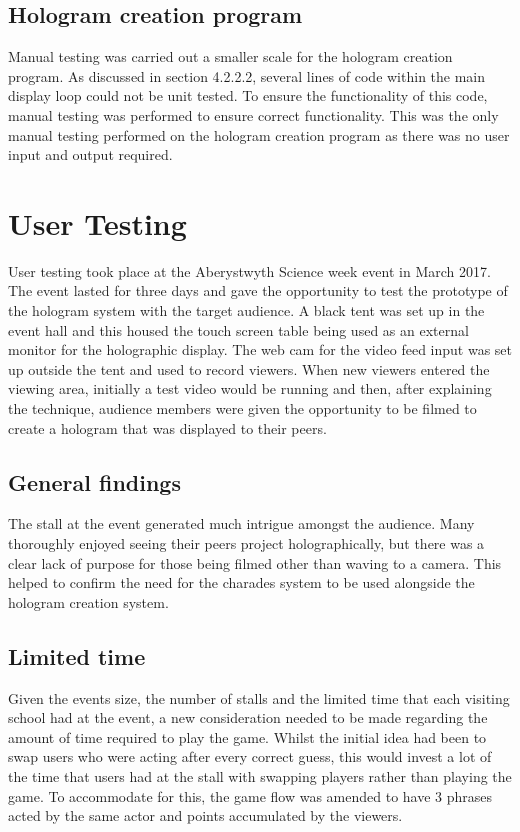 \subsection{Hologram creation program}
Manual testing was carried out a smaller scale for the hologram creation program. As discussed in section 4.2.2.2, several lines of code within the main display loop could not be unit tested. To ensure the functionality of this code, manual testing was performed to ensure correct functionality. This was the only manual testing performed on the hologram creation program as there was no user input and output required.


\section{User Testing}
User testing took place at the Aberystwyth Science week event in March 2017. The event lasted for three days and gave the opportunity to test the prototype of the hologram system with the target audience. A black tent was set up in the event hall and this housed the touch screen table being used as an external monitor for the holographic display. The web cam for the video feed input was set up outside the tent and used to record viewers. When new viewers entered the viewing area, initially a test video would be running and then, after explaining the technique, audience members were given the opportunity to be filmed to create a hologram that was displayed to their peers.

\subsection{General findings}
The stall at the event generated much intrigue amongst the audience. Many thoroughly enjoyed seeing their peers project holographically, but there was a clear lack of purpose for those being filmed other than waving to a camera. This helped to confirm the need for the charades system to be used alongside the hologram creation system.

\subsection{Limited time}
Given the events size, the number of stalls and the limited time that each visiting school had at the event, a new consideration needed to be made regarding the amount of time required to play the game. Whilst the initial idea had been to swap users who were acting after every correct guess, this would invest a lot of the time that users had at the stall with swapping players rather than playing the game. To accommodate for this, the game flow was amended to have 3 phrases acted by the same actor and points accumulated by the viewers.

